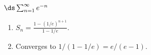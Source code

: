 {$\ds \sum_{n=1}^\infty e^{-n}$
}
{\begin{enumerate}
\item		$S_n = \frac{1-(1/e)^{n+1}}{1-1/e}$.
\item		Converges to $1/(1-1/e) = e/(e-1)$.
\end{enumerate}
}